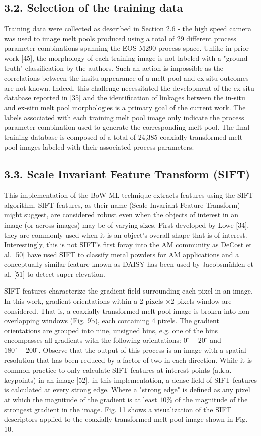 \documentclass[10pt]{article}
\begin{document}
\subsection*{3.2. Selection of the training data}
Training data were collected as described in Section 2.6 - the high speed camera was used to image melt pools produced using a total of 29 different process parameter combinations spanning the EOS M290 process space. Unlike in prior work [45], the morphology of each training image is not labeled with a "ground truth" classification by the authors. Such an action is impossible as the correlations between the insitu appearance of a melt pool and ex-situ outcomes are not known. Indeed, this challenge necessitated the development of the ex-situ database reported in [35] and the identification of linkages between the in-situ and ex-situ melt pool morphologies is a primary goal of the current work. The labels associated with each training melt pool image only indicate the process parameter combination used to generate the corresponding melt pool. The final training database is composed of a total of 24,385 coaxially-transformed melt pool images labeled with their associated process parameters.

\subsection*{3.3. Scale Invariant Feature Transform (SIFT)}
This implementation of the BoW ML technique extracts features using the SIFT algorithm. SIFT features, as their name (Scale Invariant Feature Transform) might suggest, are considered robust even when the objects of interest in an image (or across images) may be of varying sizes. First developed by Lowe [34], they are commonly used when it is an object's overall shape that is of interest. Interestingly, this is not SIFT's first foray into the AM community as DeCost et al. [50] have used SIFT to classify metal powders for AM applications and a conceptually-similar feature known as DAISY has been used by Jacobsmühlen et al. [51] to detect super-elevation.

SIFT features characterize the gradient field surrounding each pixel in an image. In this work, gradient orientations within a 2 pixels $\times 2$ pixels window are considered. That is, a coaxially-transformed melt pool image is broken into non-overlapping windows (Fig. 9b), each containing 4 pixels. The gradient orientations are grouped into nine, unsigned bins, e.g. one of the bins encompasses all gradients with the following orientations: $0^{\circ}-20^{\circ}$ and $180^{\circ}-200^{\circ}$. Observe that the output of this process is an image with a spatial resolution that has been reduced by a factor of two in each direction. While it is common practice to only calculate SIFT features at interest points (a.k.a. keypoints) in an image [52], in this implementation, a dense field of SIFT features is calculated at every strong edge. Where a "strong edge" is defined as any pixel at which the magnitude of the gradient is at least $10 \%$ of the magnitude of the strongest gradient in the image. Fig. 11 shows a visualization of the SIFT descriptors applied to the coaxially-transformed melt pool image shown in Fig. 10.
\end{document}
